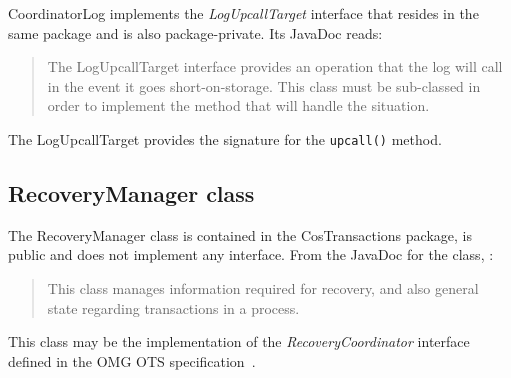 CoordinatorLog implements the \emph{LogUpcallTarget} interface that resides in the same package and is also package-private. Its JavaDoc reads:
\begin{quote}
    The LogUpcallTarget interface provides an operation that the log will call in the event it goes short-on-storage. This class must be sub-classed in order to implement the method that will handle the situation.
\end{quote}
The LogUpcallTarget provides the signature for the \texttt{upcall()} method.

\subsection{RecoveryManager class}
The RecoveryManager class is contained in the CosTransactions package, is public and does not implement any interface. From the JavaDoc for the class, :
\begin{quote}
    This class manages information required for recovery, and also general state regarding transactions in a process.
\end{quote}

This class may be the implementation of the \emph{RecoveryCoordinator} interface defined in the OMG OTS specification~\cite[p. 47]{omg-ots}.
